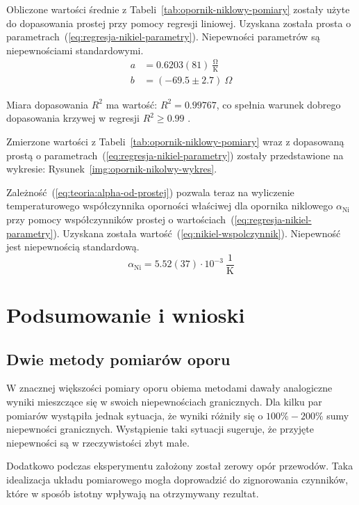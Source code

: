 \documentclass[twocolumn, a4paper, polish, 10pt]{article}
\begin{document}
Obliczone wartości średnie z Tabeli~\ref{tab:opornik-niklowy-pomiary} zostały użyte do dopasowania prostej przy pomocy regresji liniowej. Uzyskana została prosta o parametrach~(\ref{eq:regresja-nikiel-parametry}). Niepewności parametrów są niepewnościami standardowymi.
\begin{equation}
\begin{split}
    a &= 0.6203(81)~\mathrm{\frac{\Omega}{K}} \\
    b &= (-69.5 \pm 2.7)~\Omega
    \label{eq:regresja-nikiel-parametry}
\end{split}
\end{equation}

Miara dopasowania $R^2$ ma wartość: $R^2 = 0.99767$, co spełnia warunek dobrego dopasowania krzywej w regresji $R^2 \geq 0.99$ \cite{epa-8000d}.

Zmierzone wartości z Tabeli~\ref{tab:opornik-niklowy-pomiary} wraz z dopasowaną prostą o parametrach~(\ref{eq:regresja-nikiel-parametry}) zostały przedstawione na wykresie: Rysunek~\ref{img:opornik-nikolwy-wykres}.


Zależność~(\ref{eq:teoria:alpha-od-prostej}) pozwala teraz na wyliczenie temperaturowego współczynnika oporności właściwej dla opornika niklowego $\alpha_{\mathrm{Ni}}$ przy pomocy współczynników prostej o wartościach~(\ref{eq:regresja-nikiel-parametry}). Uzyskana została wartość~(\ref{eq:nikiel-wspolczynnik}). Niepewność jest niepewnością standardową.
\begin{equation}
    \alpha_{\mathrm{Ni}} = 5.52(37) \cdot 10^{-3}~\frac{1}{ \mathrm{K} }
    \label{eq:nikiel-wspolczynnik}
\end{equation}

\section{Podsumowanie i wnioski}
\subsection{Dwie metody pomiarów oporu}
\label{sec:podsumowanie:dwie-metody-pomiarow}
W znacznej większości pomiary oporu obiema metodami dawały analogiczne wyniki mieszczące się w swoich niepewnościach granicznych. Dla kilku par pomiarów wystąpiła jednak sytuacja, że wyniki różniły się o $100\%-200\%$ sumy niepewności granicznych. Wystąpienie taki sytuacji sugeruje, że przyjęte niepewności są w rzeczywistości zbyt małe.

Dodatkowo podczas eksperymentu założony został zerowy opór przewodów. Taka idealizacja układu pomiarowego mogła doprowadzić do zignorowania czynników, które w sposób istotny wpływają na otrzymywany rezultat.
\end{document}
